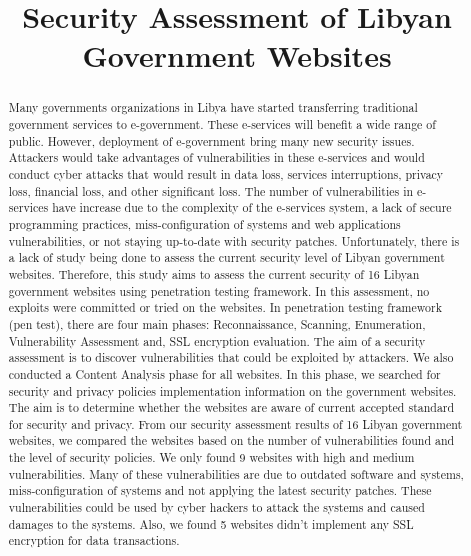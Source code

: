 \documentclass[conference]{IEEEtran}
\begin{document}
\title{Security Assessment of Libyan Government Websites}

\author{
}

\maketitle

\begin{abstract}
Many governments organizations in Libya have started
transferring traditional government services to
e-government. These e-services will
benefit a wide range of public. However, deployment of
e-government
bring many new security issues. Attackers would take advantages
of vulnerabilities in these e-services and would conduct cyber
attacks that would result in data loss, services interruptions, privacy loss,
financial loss, and other significant loss. The
number of vulnerabilities in e-services have increase due to the complexity of the e-services system, a
lack of secure programming practices, miss-configuration of
systems and web applications vulnerabilities, or not staying up-to-date with
security patches. Unfortunately, there is a lack of study being done to assess the current security level of Libyan government websites. Therefore, this study aims to assess the current security of 16 Libyan government websites using penetration testing framework.
In this assessment, no exploits were committed or tried on the websites. In penetration testing framework (pen test), there are four main phases: Reconnaissance, Scanning, Enumeration, Vulnerability
Assessment and, SSL encryption evaluation. The aim of a security assessment is to discover vulnerabilities that could be exploited by attackers.
We also conducted a
Content Analysis phase for all websites. In this phase,
we searched for security and privacy policies implementation information on
the government websites. The aim is to determine whether the websites are aware of current accepted standard for security and privacy.
From our security assessment results of 16 Libyan government websites, we compared the websites based on the number of
vulnerabilities found and the level of security policies. We only found 9 websites with high and medium vulnerabilities. Many of these vulnerabilities are due to outdated software and systems, miss-configuration of systems and not applying the latest security patches. These vulnerabilities could be used by cyber hackers to attack the systems and caused damages to the systems. Also, we found 5 websites didn't implement any SSL encryption for data transactions.

\end{abstract}
\end{document}
